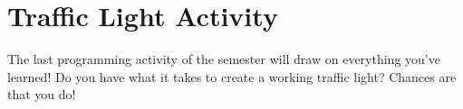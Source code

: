 
\chapter{Traffic Light Activity}
\label{day:traffic-light}


\minitoc

The last programming activity of the semester will draw on everything you've learned!  Do you have what it takes to create a working traffic light?  Chances are that you do!